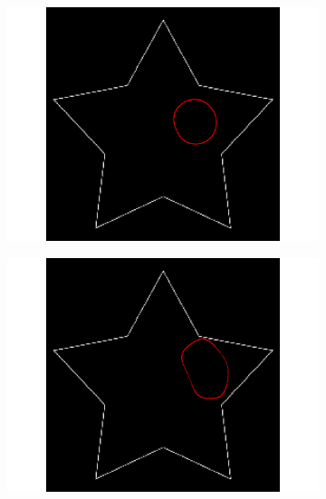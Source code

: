 \begin{figure}[H]
\begin{subfigure}[c]{0.3\linewidth}
\centering
\includegraphics[width=\textwidth]{Chapters/Images/Init/vfcus1}
\caption{}
\end{subfigure}
\begin{subfigure}[c]{0.3\linewidth}
\centering
\includegraphics[width=\textwidth]{Chapters/Images/Init/vfcus2}
\caption{}
\end{subfigure}
\begin{subfigure}[c]{0.3\linewidth}
\centering

\end{subfigure}
\end{figure}
